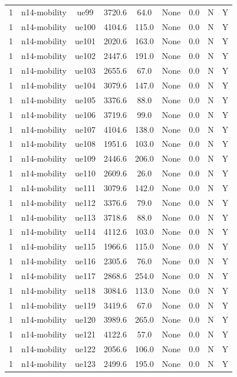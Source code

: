 \begin{table}[ht]
\begin{tabular}{|c|c|c|c|c|c|c|c|c|}
1 & n14-mobility & ue99 & 3720.6 & 64.0 & None & 0.0 & N & Y \\
1 & n14-mobility & ue100 & 4104.6 & 115.0 & None & 0.0 & N & Y \\
1 & n14-mobility & ue101 & 2020.6 & 163.0 & None & 0.0 & N & Y \\
1 & n14-mobility & ue102 & 2447.6 & 191.0 & None & 0.0 & N & Y \\
1 & n14-mobility & ue103 & 2655.6 & 67.0 & None & 0.0 & N & Y \\
1 & n14-mobility & ue104 & 3079.6 & 147.0 & None & 0.0 & N & Y \\
1 & n14-mobility & ue105 & 3376.6 & 88.0 & None & 0.0 & N & Y \\
1 & n14-mobility & ue106 & 3719.6 & 99.0 & None & 0.0 & N & Y \\
1 & n14-mobility & ue107 & 4104.6 & 138.0 & None & 0.0 & N & Y \\
1 & n14-mobility & ue108 & 1951.6 & 103.0 & None & 0.0 & N & Y \\
1 & n14-mobility & ue109 & 2446.6 & 206.0 & None & 0.0 & N & Y \\
1 & n14-mobility & ue110 & 2609.6 & 26.0 & None & 0.0 & N & Y \\
1 & n14-mobility & ue111 & 3079.6 & 142.0 & None & 0.0 & N & Y \\
1 & n14-mobility & ue112 & 3376.6 & 79.0 & None & 0.0 & N & Y \\
1 & n14-mobility & ue113 & 3718.6 & 88.0 & None & 0.0 & N & Y \\
1 & n14-mobility & ue114 & 4112.6 & 103.0 & None & 0.0 & N & Y \\
1 & n14-mobility & ue115 & 1966.6 & 115.0 & None & 0.0 & N & Y \\
1 & n14-mobility & ue116 & 2305.6 & 76.0 & None & 0.0 & N & Y \\
1 & n14-mobility & ue117 & 2868.6 & 254.0 & None & 0.0 & N & Y \\
1 & n14-mobility & ue118 & 3084.6 & 113.0 & None & 0.0 & N & Y \\
1 & n14-mobility & ue119 & 3419.6 & 67.0 & None & 0.0 & N & Y \\
1 & n14-mobility & ue120 & 3989.6 & 265.0 & None & 0.0 & N & Y \\
1 & n14-mobility & ue121 & 4122.6 & 57.0 & None & 0.0 & N & Y \\
1 & n14-mobility & ue122 & 2056.6 & 106.0 & None & 0.0 & N & Y \\
1 & n14-mobility & ue123 & 2499.6 & 195.0 & None & 0.0 & N & Y \\

\end{tabular}
\end{table}
